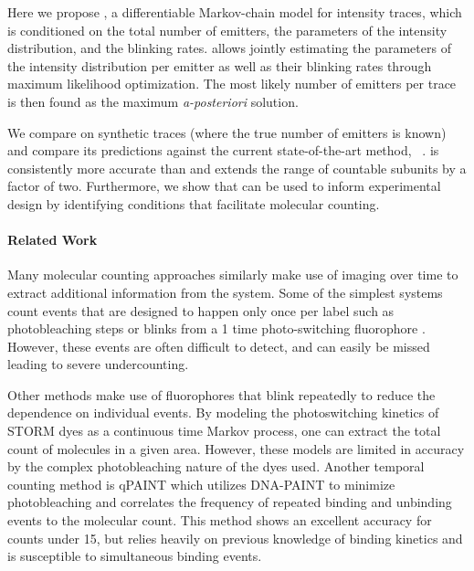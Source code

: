 Here we propose \ours, a differentiable Markov-chain model for intensity
traces, which is conditioned on the total number of emitters, the parameters of
the intensity distribution, and the blinking rates.
%
  \ours allows jointly estimating the parameters of the intensity distribution
  per emitter as well as their blinking rates through maximum likelihood
  optimization.
  The most likely number of emitters per trace is then found as the maximum
  \emph{a-posteriori} solution.

We compare \ours on synthetic traces (where the true number of emitters is
known) and compare its predictions against the current state-of-the-art method,
\lbfcs~\citep{stein_calibration-free_2021}.
%
  \ours is consistently more accurate than \lbfcs and extends the range of
  countable subunits by a factor of two.
  Furthermore, we show that \ours can be used to inform experimental design by
  identifying conditions that facilitate molecular counting.

\paragraph{Related Work}

Many molecular counting approaches similarly
  make use of imaging over time to extract additional information from the
  system. Some of the simplest systems count events that are designed to happen
  only once per label such as photobleaching steps \cite{Ulbrich_subunit_2007} or
  blinks from a 1 time photo-switching fluorophore
  \cite{gunzenhauser_quantitative_2012}. However, these events are often difficult to
  detect, and can easily be missed leading to severe undercounting.

Other methods make use of fluorophores that blink repeatedly to reduce the
dependence on individual events.
%
  By modeling the photoswitching kinetics of STORM dyes as a continuous time
  Markov process, \cite{patel_blinking_2021, rollins_stochastic_2015} one can extract the total count of molecules
  in a given area. However, these models are limited in accuracy by the complex
  photobleaching nature of the dyes used. Another temporal counting method is
  qPAINT \cite{jungmann_quantitative_2016} which utilizes DNA-PAINT to minimize photobleaching and
  correlates the frequency of repeated binding and unbinding events to the
  molecular count. This method shows an excellent accuracy for counts under 15,
  but relies heavily on previous knowledge of binding kinetics and is
  susceptible to simultaneous binding events.

